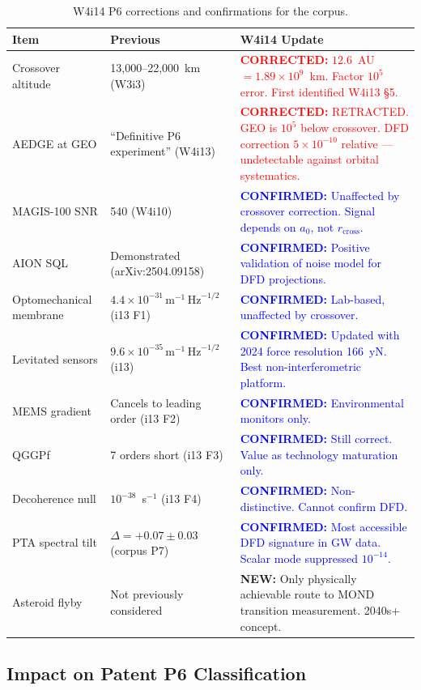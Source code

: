 \documentclass[11pt]{article}
\theoremstyle{definition}
\theoremstyle{remark}
\newcommand{\ee}[1]{\times10^{#1}}
\newcommand{\sqrtHz}{\,\mathrm{Hz}^{-1/2}}
\newcommand{\azero}{a_0}
\newcommand{\confirmed}[1]{\textcolor{blue}{\textbf{CONFIRMED:} #1}}
\newcommand{\corrected}[1]{\textcolor{red}{\textbf{CORRECTED:} #1}}
\newcommand{\newresult}[1]{\textcolor{green!50!black}{\textbf{NEW:} #1}}
\begin{document}
\begin{table}[H]
\centering
\small
\caption{W4i14 P6 corrections and confirmations for the corpus.}
\begin{tabular}{@{}p{4cm}p{4cm}p{5cm}@{}}
\toprule
Item & Previous & W4i14 Update \\
\midrule
Crossover altitude & 13,000--22,000~km (W3i3) &
  \corrected{$12.6$~AU $= 1.89\ee{9}$~km. Factor $10^5$ error.
  First identified W4i13 \S5.} \\
AEDGE at GEO & ``Definitive P6 experiment'' (W4i13) &
  \corrected{RETRACTED. GEO is $10^5$ below crossover.
  DFD correction $5\ee{-10}$ relative --- undetectable against
  orbital systematics.} \\
MAGIS-100 SNR & 540 (W4i10) & \confirmed{Unaffected by crossover
  correction. Signal depends on $\azero$, not $r_{\mathrm{cross}}$.} \\
AION SQL & Demonstrated (arXiv:2504.09158) & \confirmed{Positive
  validation of noise model for DFD projections.} \\
Optomechanical membrane & $4.4\ee{-31}\,\mathrm{m}^{-1}\sqrtHz$
  (i13 F1) & \confirmed{Lab-based, unaffected by crossover.} \\
Levitated sensors & $9.6\ee{-35}\,\mathrm{m}^{-1}\sqrtHz$
  (i13) & \confirmed{Updated with 2024 force resolution 166~yN.
  Best non-interferometric platform.} \\
MEMS gradient & Cancels to leading order (i13 F2) &
  \confirmed{Environmental monitors only.} \\
QGGPf & 7 orders short (i13 F3) & \confirmed{Still correct.
  Value as technology maturation only.} \\
Decoherence null & $10^{-38}$~s$^{-1}$ (i13 F4) &
  \confirmed{Non-distinctive. Cannot confirm DFD.} \\
PTA spectral tilt & $\Delta = +0.07 \pm 0.03$ (corpus P7) &
  \confirmed{Most accessible DFD signature in GW data.
  Scalar mode suppressed $10^{-14}$.} \\
Asteroid flyby & Not previously considered &
  \newresult{Only physically achievable route to MOND transition
  measurement. 2040s+ concept.} \\
\bottomrule
\end{tabular}
\end{table}

\subsection{Impact on Patent P6 Classification}
\end{document}
